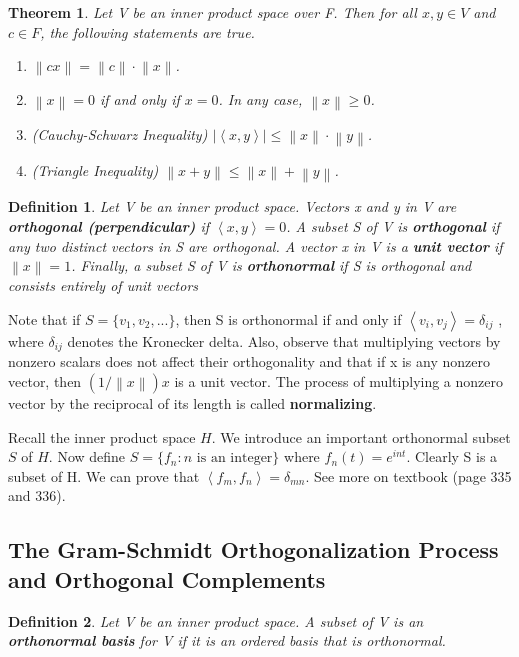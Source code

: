 \documentclass{article}
\newcommand{\abs}[1]{\left\lvert#1\right\rvert}
\newcommand{\norm}[1]{\left\lVert#1\right\rVert}
\newcommand{\bd}[1]{\textbf{#1}}
\newcommand{\ip}[1]{\left\langle {#1}\right\rangle} %
\theoremstyle{plain}
\newtheorem{theorem}{Theorem}[section]
\newtheorem*{definition1}{Definition}
\theoremstyle{plain} %
\begin{document}
\begin{theorem}
  Let V be an inner product space over F. Then for all $x, y \in V$ and $c \in F$, the following statements are true.
  \begin{enumerate}[label=(\alph*)]
    \item $\norm{cx}=\norm{c}\cdot \norm{x}$.
    \item $\norm{x}=0$ if and only if $x=0$. In any case, $\norm{x}\geq 0$.
    \item (Cauchy-Schwarz Inequality) $\abs{\ip{x, y}} \leq \norm{x} \cdot \norm{y}$.
    \item (Triangle Inequality) $\norm{x+y}\leq \norm{x}+\norm{y}$.
  \end{enumerate}
\end{theorem}

\begin{definition1}
  Let V be an inner product space.  Vectors x and y in V are \bd{orthogonal (perpendicular)} if $\ip{x, y}=0$. A subset S of V is \bd{orthogonal} if any two distinct vectors in S are orthogonal. A vector x in V is a \bd{unit vector} if $\norm{x}=1$. Finally, a subset S of V is \bd{orthonormal} if S is orthogonal and consists entirely of unit vectors
\end{definition1}

Note that if $S = \{v_1, v_2,...\}$, then S is orthonormal if and only if $\ip{v_i, v_j}=\delta_{ij}$ , where $\delta_{ij}$ denotes the Kronecker delta. Also, observe that multiplying vectors by nonzero scalars does not affect their orthogonality and that if x is any nonzero vector, then $(1/\norm{x})x$ is a unit vector. The process of multiplying a nonzero vector by the reciprocal of its length is called \bd{normalizing}.

Recall the inner product space $H$. We introduce an important orthonormal subset $S$ of $H$. Now define $S = \{f_n : n\text{ is an integer}\}$ where $f_n(t)=e^{int}$. Clearly S is a subset of H. We can prove that $\ip{f_m, f_n}=\delta_{mn}$. See more on textbook (page 335 and 336).

\subsection {The Gram-Schmidt Orthogonalization Process and Orthogonal Complements}

\begin{definition1}
Let V be an inner product space. A subset of V is an \bd{orthonormal basis} for V if it is an ordered basis that is orthonormal.
\end{definition1}
\end{document}
